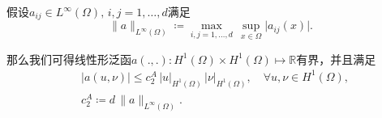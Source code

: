 \begin{lemma}
  \label{lemma:var-bvp-aform-inequality}
  假设$a_{ij} \in L^{\infty}(\Omega), \, i,j = 1,\ldots,d$满足
  \begin{equation}
    \label{eq:var-bvp-coeff-norm}
    \big\| a \big\|_{L^{\infty}(\Omega)} \coloneqq \max_{i,j=1,\ldots,d} \, \sup_{x \in \Omega} \big| a_{ij}(x) \big|.
  \end{equation}

  那么我们可得线性形泛函$a(.,.): H^{1}(\Omega) \times H^{1}(\Omega) \mapsto \mathbb{R}$有界，并且满足
  \begin{equation}
    \label{eq:var-bvp-a-c2a-inequality}
    \begin{split}
    &\big| a (u, \nu) \big| \le c_2^A \, \big| u \big|_{H^{1}(\Omega)} \, \big| \nu \big|_{H^1(\Omega)}, \quad \forall u, \nu \in H^{1}(\Omega), \\
    & c_2^A \coloneqq d \, \big\| a \big\|_{L^{\infty}(\Omega)}.
  \end{split}
\end{equation}
\end{lemma}

